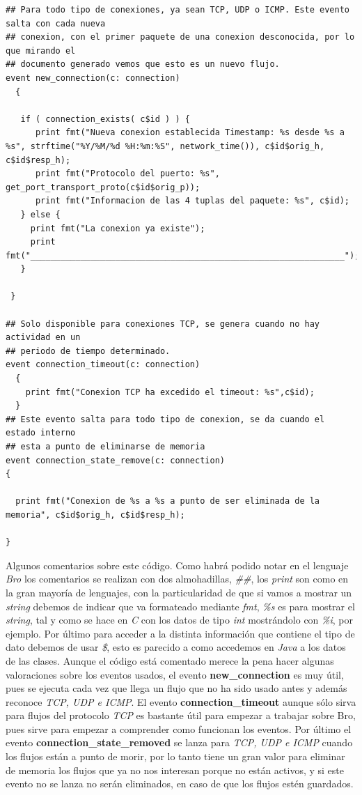 \begin{lstlisting}[style=CodigoC]
## Para todo tipo de conexiones, ya sean TCP, UDP o ICMP. Este evento salta con cada nueva
## conexion, con el primer paquete de una conexion desconocida, por lo que mirando el
## documento generado vemos que esto es un nuevo flujo.
event new_connection(c: connection)
  {

   if ( connection_exists( c$id ) ) {
      print fmt("Nueva conexion establecida Timestamp: %s desde %s a %s", strftime("%Y/%M/%d %H:%m:%S", network_time()), c$id$orig_h, c$id$resp_h);
      print fmt("Protocolo del puerto: %s", get_port_transport_proto(c$id$orig_p));
      print fmt("Informacion de las 4 tuplas del paquete: %s", c$id);
   } else {
     print fmt("La conexion ya existe");
     print fmt("_______________________________________________________________");
   }

 }

## Solo disponible para conexiones TCP, se genera cuando no hay actividad en un
## periodo de tiempo determinado.
event connection_timeout(c: connection)
  {
    print fmt("Conexion TCP ha excedido el timeout: %s",c$id);
  }
## Este evento salta para todo tipo de conexion, se da cuando el estado interno
## esta a punto de eliminarse de memoria
event connection_state_remove(c: connection)
{

  print fmt("Conexion de %s a %s a punto de ser eliminada de la memoria", c$id$orig_h, c$id$resp_h);

}
\end{lstlisting}

Algunos comentarios sobre este código. Como habrá podido notar en el 
lenguaje \textit{Bro} los comentarios se realizan con dos almohadillas, \textit{\#\#}, 
los \textit{print} son como en la gran mayoría de lenguajes, con la particularidad 
de que si vamos a mostrar un \textit{string} debemos de indicar que va formateado 
mediante \textit{fmt}, \textit{\%s} es para mostrar el \textit{string}, tal y como se hace en \textit{C} con 
los datos de tipo \textit{int} mostrándolo con \textit{\%i}, por ejemplo. Por último para 
acceder a la distinta información que contiene el tipo de dato debemos 
de usar \textit{\$}, esto es parecido a como accedemos en \textit{Java} a los datos de las clases.
\intro
Aunque el código está comentado merece la pena hacer algunas valoraciones 
sobre los eventos usados, el evento \textbf{new\_connection} es muy útil, pues se 
ejecuta cada vez que llega un flujo que no ha sido usado antes y además 
reconoce \textit{TCP, UDP e ICMP}. El evento \textbf{connection\_timeout} aunque sólo sirva 
para flujos del protocolo \textit{TCP} es bastante útil para empezar a trabajar 
sobre Bro, pues sirve para empezar a comprender como funcionan los eventos. 
Por último el evento \textbf{connection\_state\_removed} se lanza para \textit{TCP, UDP e ICMP} 
cuando los flujos están a punto de morir, por lo tanto tiene un gran valor 
para eliminar de memoria los flujos que ya no nos interesan porque no están 
activos, y si este evento no se lanza no serán eliminados, en caso de que 
los flujos estén guardados.

